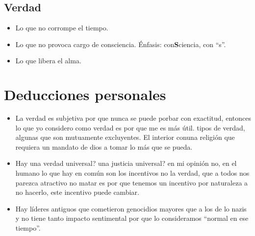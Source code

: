 
\subsection{Verdad}
\begin{itemize}
    \item Lo que no corrompe el tiempo.
    \item Lo que no provoca cargo de consciencia. Énfasis: con\textbf{S}ciencia, con ``s''.
    \item Lo que libera el alma.
\end{itemize}

\section{Deducciones personales}
\begin{itemize}
    \item La verdad es subjetiva por que nunca se puede porbar con exactitud, entonces lo que yo considero como verdad es por que me es más útil.
    tipos de verdad, algunas que son mutuamente excluyentes. El interior conuna religión que requiera un mandato de dios a tomar lo más que se pueda.
    \item Hay una verdad universal? una justicia universal? en mi opinión no, en el humano lo que hay en común son los incentivos no la verdad, que a todos nos parezca atractivo no matar es por que tenemos un incentivo por naturaleza a no hacerlo, este incentivo puede cambiar.
    \item Hay líderes antiguos que cometieron genocidios mayores que a los de lo nazis y no tiene tanto impacto sentimental por que lo consideramos ``normal en ese tiempo''.
\end{itemize}




